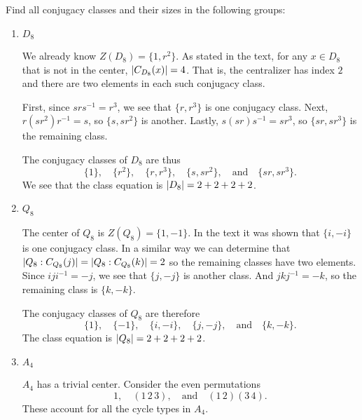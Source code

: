  Find all conjugacy classes and their sizes in the following
groups:
\begin{enumerate}
\item $D_8$
  \begin{solution}
    We already know $Z(D_8) = \{1, r^2\}$. As stated in the text, for
    any $x\in D_8$ that is not in the center, $\lvert{C_{D_8}(x)}\rvert =
    4$. That is, the centralizer has index $2$ and there are two
    elements in each such conjugacy class.

    First, since $srs^{-1} = r^3$, we see that $\{r, r^3\}$ is one
    conjugacy class. Next, $r(sr^2)r^{-1} = s$, so $\{s, sr^2\}$ is
    another. Lastly, $s(sr)s^{-1} = sr^3$, so $\{sr, sr^3\}$ is the
    remaining class.

    The conjugacy classes of $D_8$ are thus
    \begin{equation*}
      \{1\}, \quad
      \{r^2\}, \quad
      \{r, r^3\}, \quad
      \{s, sr^2\}, \quad\text{and}\quad
      \{sr, sr^3\}.
    \end{equation*}
    We see that the class equation is $\lvert{D_8}\rvert = 2 + 2 + 2 + 2$.
  \end{solution}

\item $Q_8$
  \begin{solution}
    The center of $Q_8$ is $Z(Q_8) = \{1, -1\}$. In the text it was
    shown that $\{i, -i\}$ is one conjugacy class. In a similar way we
    can determine that
    $\lvert{Q_8: C_{Q_8}(j)}\rvert = \lvert{Q_8: C_{Q_8}(k)}\rvert = 2$ so the
    remaining classes have two elements. Since $iji^{-1} = -j$, we see
    that $\{j, -j\}$ is another class. And $jkj^{-1} = -k$, so the
    remaining class is $\{k, -k\}$.

    The conjugacy classes of $Q_8$ are therefore
    \begin{equation*}
      \{1\}, \quad
      \{-1\}, \quad
      \{i, -i\}, \quad
      \{j, -j\}, \quad\text{and}\quad
      \{k, -k\}.
    \end{equation*}
    The class equation is $\lvert{Q_8}\rvert = 2 + 2 + 2 + 2$.
  \end{solution}

\item $A_4$
  \begin{solution}
    $A_4$ has a trivial center. Consider the even permutations
    \begin{equation*}
      1, \quad
      (1\,2\,3), \quad\text{and}\quad
      (1\,2)(3\,4).
    \end{equation*}
    These account for all the cycle types in $A_4$.


\end{solution}
\end{enumerate}
